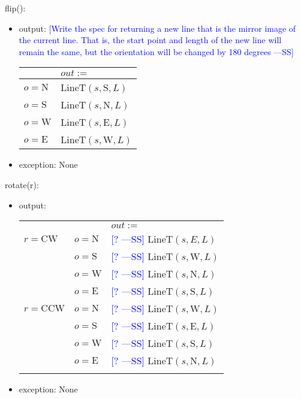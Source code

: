 \documentclass[12pt]{article}
\newcommand{\authornote}[3]{\textcolor{#1}{[#3 ---#2]}}
\newcommand{\authornote}[3]{}
\newcommand{\wss}[1]{\authornote{blue}{SS}{#1}}
\begin{document}
\noindent flip():
\begin{itemize}
\item output: \wss{Write the spec for returning a new line that is the mirror
    image of the current line.  That is, the start point and length of the new
    line will remain the same, but the orientation will be changed by 180
    degrees}
\\
\begin{tabular}{|l|l|}
\hline
 & $out:=$  \\
\hline
$o = \mbox{N}$ & LineT$(s, \mbox{S}, L)$  \\
\hline
$o = \mbox{S}$ & LineT$(s, \mbox{N}, L)$ \\
\hline
$o = \mbox{W}$ & LineT$(s, \mbox{E}, L)$\\
\hline
$o = \mbox{E}$ & LineT$(s, \mbox{W}, L)$ \\
\hline
\end{tabular}
\item exception: None
\end{itemize}

\noindent rotate(r):
\begin{itemize}
\item output: 
\begin{tabular}{|p{}|p{2.3cm}|l|}
\hhline{~|~|-|}
\multicolumn{1}{r}{} & \multicolumn{1}{r|}{} & \multicolumn{1}{l|}{$out :=$}\\
\hhline{|-|-|-|}
$r = \mbox{CW}$ & $o = \mbox{N}$ & \wss{?} $\mbox{LineT}(s, E, L)$\\
\hhline{|~|-|-|}
~ & $o = \mbox{S}$ &   \wss{?} $\mbox{LineT}(s, \mbox{W}, L)$ \\
\hhline{|~|-|-|}
~ & $o = \mbox{W}$ &  \wss{?} $\mbox{LineT}(s, \mbox{N}, L)$ \\
\hhline{|~|-|-|}
~ & $o = \mbox{E}$ &   \wss{?} $\mbox{LineT}(s, \mbox{S}, L)$\\
\hhline{-|-|-|}
$r = \mbox{CCW}$ & $o = \mbox{N}$ &   \wss{?} $ \mbox{LineT}(s, \mbox{W}, L)$\\
\hhline{|~|-|-|}
~ & $o = \mbox{S}$ &   \wss{?} $ \mbox{LineT}(s, \mbox{E}, L)$ \\
\hhline{|~|-|-|}
~ & $o = \mbox{W}$ &  \wss{?}  $  \mbox{LineT}(s, \mbox{S}, L)$\\
\hhline{|~|-|-|}
~ & $o = \mbox{E}$ &   \wss{?}  $  \mbox{LineT}(s, \mbox{N}, L)$\\
\hhline{-|-|-|}
\end{tabular}

\item exception: None
\end{itemize}
\end{document}
